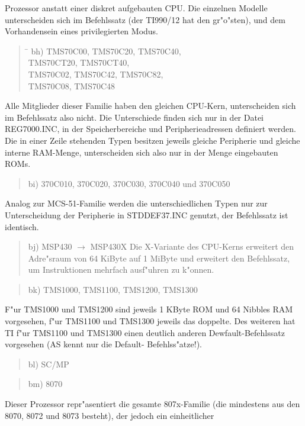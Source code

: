 \documentclass[12pt,a4paper,twoside]{report}
\begin{document}
Prozessor anstatt einer diskret aufgebauten CPU.  Die einzelnen Modelle
unterscheiden sich im Befehlssatz (der TI990/12 hat den gr"o"sten), und
dem Vorhandensein eines privilegierten Modus.
\begin{quote}
\begin{tabbing}
\hspace{0.7cm} \= \kill
bh) \> TMS70C00, TMS70C20, TMS70C40, \\
    \> TMS70CT20, TMS70CT40, \\
    \> TMS70C02, TMS70C42, TMS70C82, \\
    \> TMS70C08, TMS70C48 \\
\end{tabbing}
\end{quote}
Alle Mitglieder dieser Familie haben den gleichen CPU-Kern,
unterscheiden sich im Befehlssatz also nicht.  Die Unterschiede
finden sich nur in der Datei REG7000.INC, in der Speicherbereiche
und Peripherieadressen definiert werden.  Die in einer Zeile
stehenden  Typen besitzen jeweils gleiche Peripherie und gleiche
interne RAM-Menge, unterscheiden sich also nur in der Menge
eingebauten ROMs.
\begin{quote}
bi) 370C010, 370C020, 370C030, 370C040 und 370C050
\end{quote}
Analog zur MCS-51-Familie werden die unterschiedlichen Typen nur
zur Unterscheidung der Peripherie in STDDEF37.INC genutzt, der
Befehlssatz ist identisch.
\begin{quote}
bj) MSP430 $\rightarrow$ MSP430X
Die X-Variante des CPU-Kerns erweitert den Adre"sraum von 64
KiByte auf 1 MiByte und erweitert den Befehlssatz, um
Instruktionen mehrfach ausf"uhren zu k"onnen.
\end{quote}
\begin{quote}
bk) TMS1000, TMS1100, TMS1200, TMS1300
\end{quote}
F"ur TMS1000 und TMS1200 sind jeweils 1 KByte ROM und 64 Nibbles
RAM vorgesehen, f"ur TMS1100 und TMS1300 jeweils das doppelte.  Des
weiteren hat TI f"ur TMS1100 und TMS1300 einen deutlich anderen
Dewfault-Befehlssatz vorgesehen (AS kennt nur die Default-
Befehlss"atze!).
\begin{quote}
bl) SC/MP
\end{quote}
\begin{quote}
bm) 8070
\end{quote}
Dieser Prozessor repr"asentiert die gesamte 807x-Familie (die mindestens
aus den 8070, 8072 und 8073 besteht), der jedoch ein einheitlicher
\end{document}

